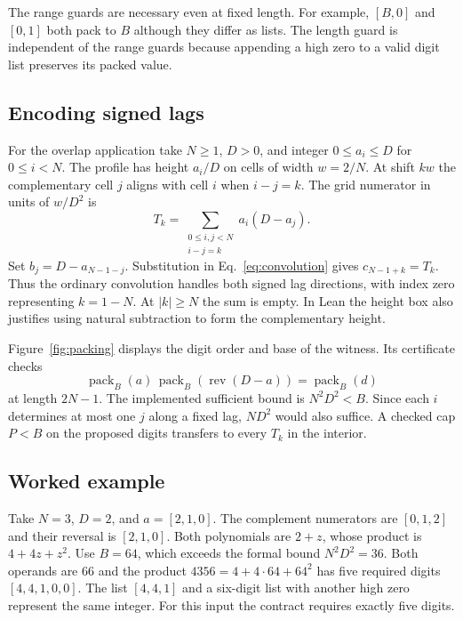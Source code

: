 \documentclass[sigplan,10pt,anonymous,review,balance=false]{acmart}
\newcommand{\pack}{\operatorname{pack}}
\begin{document}
The range guards are necessary even at fixed length. For example,
$[B,0]$ and $[0,1]$ both pack to $B$ although they differ as lists.
The length guard is independent of the range guards because
appending a high zero to a valid digit list preserves its packed
value.

\subsection{Encoding signed lags}

For the overlap application take $N\ge1$, $D>0$, and integer
$0\le a_i\le D$ for $0\le i<N$. The profile has height $a_i/D$
on cells of width $w=2/N$. At shift $kw$ the complementary cell
$j$ aligns with cell $i$ when $i-j=k$. The grid numerator in units
of $w/D^2$ is
\begin{equation}
 T_k=\sum_{\substack{0\le i,j<N\\i-j=k}}a_i(D-a_j).
 \label{eq:lag}
\end{equation}
Set $b_j=D-a_{N-1-j}$. Substitution in
Eq.~\eqref{eq:convolution} gives $c_{N-1+k}=T_k$. Thus the
ordinary convolution handles both signed lag directions, with
index zero representing $k=1-N$. At $|k|\ge N$ the sum is empty.
In Lean the height box also justifies using natural subtraction
to form the complementary height.

Figure~\ref{fig:packing} displays the digit order and base of the
witness. Its certificate checks
\begin{equation}
 \pack_B(a)\,\pack_B(\operatorname{rev}(D-a))
   =\pack_B(d)
 \label{eq:product}
\end{equation}
at length $2N-1$. The implemented sufficient bound is
$N^2D^2<B$. Since each $i$ determines at most one $j$ along a
fixed lag, $ND^2$ would also suffice. A checked cap $P<B$ on
the proposed digits transfers to every $T_k$ in the interior.


\subsection{Worked example}

Take $N=3$, $D=2$, and $a=[2,1,0]$. The complement numerators are
$[0,1,2]$ and their reversal is $[2,1,0]$. Both polynomials are
$2+z$, whose product is $4+4z+z^2$. Use $B=64$, which exceeds
the formal bound $N^2D^2=36$. Both operands are $66$ and the
product $4356=4+4\cdot64+64^2$ has five required digits
$[4,4,1,0,0]$. The list $[4,4,1]$ and a six-digit list with
another high zero represent the same integer. For this input
the contract requires exactly five digits.
\end{document}
